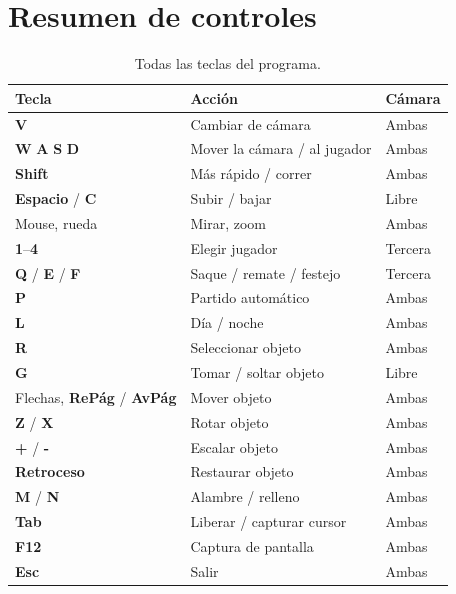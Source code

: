 \documentclass[12pt,letterpaper]{article}
\newcommand{\tecla}[1]{\textbf{#1}}
\begin{document}
\section{Resumen de controles}
\begin{table}[H]
  \centering
  \caption{Todas las teclas del programa.}
  \small
  \renewcommand{\arraystretch}{1.15}
  \begin{tabularx}{\linewidth}{>{\raggedright\arraybackslash}p{4.2cm} X l}
    \toprule
    \textbf{Tecla} & \textbf{Acción} & \textbf{Cámara} \\
    \midrule
    \tecla{V}                               & Cambiar de cámara              & Ambas \\
    \tecla{W} \tecla{A} \tecla{S} \tecla{D} & Mover la cámara / al jugador   & Ambas \\
    \tecla{Shift}                           & Más rápido / correr            & Ambas \\
    \tecla{Espacio} / \tecla{C}             & Subir / bajar                  & Libre \\
    Mouse, rueda                            & Mirar, zoom                    & Ambas \\
    \tecla{1}--\tecla{4}                    & Elegir jugador                 & Tercera \\
    \tecla{Q} / \tecla{E} / \tecla{F}       & Saque / remate / festejo       & Tercera \\
    \tecla{P}                               & Partido automático             & Ambas \\
    \tecla{L}                               & Día / noche                    & Ambas \\
    \tecla{R}                               & Seleccionar objeto             & Ambas \\
    \tecla{G}                               & Tomar / soltar objeto          & Libre \\
    Flechas, \tecla{RePág} / \tecla{AvPág}  & Mover objeto                   & Ambas \\
    \tecla{Z} / \tecla{X}                   & Rotar objeto                   & Ambas \\
    \tecla{+} / \tecla{-}                   & Escalar objeto                 & Ambas \\
    \tecla{Retroceso}                       & Restaurar objeto               & Ambas \\
    \tecla{M} / \tecla{N}                   & Alambre / relleno              & Ambas \\
    \tecla{Tab}                             & Liberar / capturar cursor      & Ambas \\
    \tecla{F12}                             & Captura de pantalla            & Ambas \\
    \tecla{Esc}                             & Salir                          & Ambas \\
    \bottomrule
  \end{tabularx}
\end{table}
\end{document}
